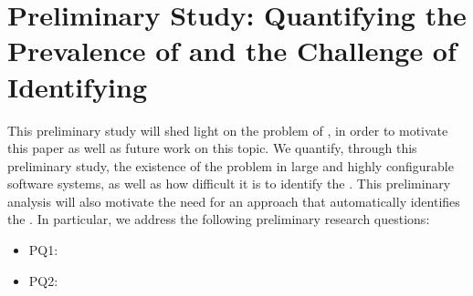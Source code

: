 
\section{Preliminary Study: Quantifying the Prevalence of \inconsistent and the Challenge of Identifying \inconsistent } \label{sec:pq-results}

This preliminary study will shed light on the problem of \inconsistent, in order to motivate this paper as well as future work on this topic. We quantify, through this preliminary study, the existence of the \inconsistent problem in large and highly configurable software systems, as well as how difficult it is to identify the \inconsistent. 
This preliminary analysis will also motivate the need for an approach that automatically identifies the \inconsistent. 
In particular, we address the following preliminary research questions: 

\begin{itemize}
    \item[] PQ1: \PQI
    \item[] PQ2: \PQII
\end{itemize}

